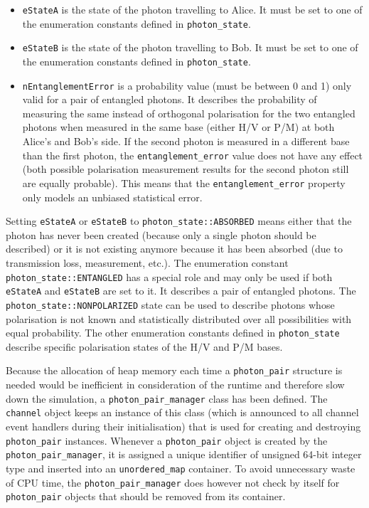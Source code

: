 \begin{itemize}

\item \texttt{eStateA} is the state of the photon travelling to Alice. It must be set to one of the enumeration constants defined in \texttt{photon\_state}.

\item \texttt{eStateB} is the state of the photon travelling to Bob. It must be set to one of the enumeration constants defined in \texttt{photon\_state}.

\item \texttt{nEntanglementError} is a probability value (must be between 0 and 1) only valid for a pair of entangled photons. It describes the probability of measuring the same instead of orthogonal polarisation for the two entangled photons when measured in the same base (either H/V or P/M) at both Alice's and Bob's side. If the second photon is measured in a different base than the first photon, the \texttt{entanglement\_error} value does not have any effect (both possible polarisation measurement results for the second photon still are equally probable). This means that the \texttt{entanglement\_error} property only models an unbiased statistical error.

\end{itemize}

Setting \texttt{eStateA} or \texttt{eStateB} to \texttt{photon\_state::ABSORBED} means either that the photon has never been created (because only a single photon should be described) or it is not existing anymore because it has been absorbed (due to transmission loss, measurement, etc.). The enumeration constant \texttt{photon\_state::ENTANGLED} has a special role and may only be used if both \texttt{eStateA} and \texttt{eStateB} are set to it. It describes a pair of entangled photons. The \texttt{photon\_state::NONPOLARIZED} state can be used to describe photons whose polarisation is not known and statistically distributed over all possibilities with equal probability. The other enumeration constants defined in \texttt{photon\_state} describe specific polarisation states of the H/V and P/M bases.

Because the allocation of heap memory each time a \texttt{photon\_pair} structure is needed would be inefficient in consideration of the runtime and therefore slow down the simulation, a \texttt{photon\_pair\_manager} class has been defined. The \texttt{channel} object keeps an instance of this class (which is announced to all channel event handlers during their initialisation) that is used for creating and destroying \texttt{photon\_pair} instances. Whenever a \texttt{photon\_pair} object is created by the \texttt{photon\_pair\_manager}, it is assigned a unique identifier of unsigned 64-bit integer type and inserted into an \texttt{unordered\_map} container. To avoid unnecessary waste of CPU time, the \texttt{photon\_pair\_manager} does however not check by itself for \texttt{photon\_pair} objects that should be removed from its container. 

